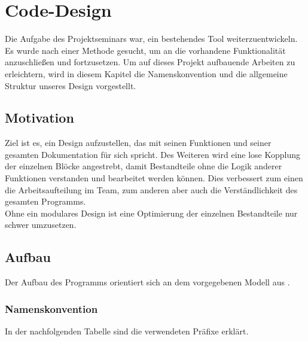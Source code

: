 \documentclass[../Report.tex]{subfiles}
\begin{document}
\chapter{Code-Design}
\label{chap:code}
Die Aufgabe des Projektseminars war, ein bestehendes Tool weiterzuentwickeln. Es wurde nach einer Methode gesucht, um an die vorhandene Funktionalität anzuschließen und fortzusetzen. Um auf dieses Projekt aufbauende Arbeiten zu erleichtern, wird in diesem Kapitel die Namenskonvention und die allgemeine Struktur unseres Design vorgestellt.

\section{Motivation}
\label{sec:code.motivation}
Ziel ist es, ein Design aufzustellen, das mit seinen Funktionen und seiner gesamten Dokumentation für sich spricht. Des Weiteren wird eine lose Kopplung der einzelnen Blöcke angestrebt, damit Bestandteile ohne die Logik anderer Funktionen verstanden und bearbeitet werden können. Dies verbessert zum einen die Arbeitsaufteilung im Team, zum anderen aber auch die Verständlichkeit des gesamten Programms. \\
Ohne ein modulares Design ist eine Optimierung der einzelnen Bestandteile nur schwer umzusetzen.

\section{Aufbau}
\label{sec:code.aufbau}
Der Aufbau des Programms orientiert sich an dem vorgegebenen Modell aus .

\subsection*{Namenskonvention}
\label{subsec:code.namen}
In der nachfolgenden Tabelle sind die verwendeten Präfixe erklärt.
	
\end{document}
